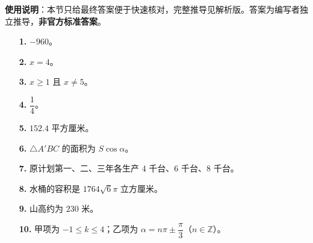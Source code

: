 
\begin{gknotice}
\textbf{使用说明}：本节只给最终答案便于快速核对，完整推导见解析版。答案为编写者独立推导，\textbf{非官方标准答案}。
\end{gknotice}

\begin{itemize}[leftmargin=2.6em]
  \item[\textbf{1.}] $-960$。
  \item[\textbf{2.}] $x=4$。
  \item[\textbf{3.}] $x\ge1$ 且 $x\ne5$。
  \item[\textbf{4.}] $\dfrac14$。
  \item[\textbf{5.}] $152.4$ 平方厘米。
  \item[\textbf{6.}] $\triangle A'BC$ 的面积为 $S\cos\alpha$。
\end{itemize}

\begin{itemize}[leftmargin=2.6em]
  \item[\textbf{7.}] 原计划第一、二、三年各生产 $4$ 千台、$6$ 千台、$8$ 千台。
  \item[\textbf{8.}] 水桶的容积是 $1764\sqrt6\pi$ 立方厘米。
  \item[\textbf{9.}] 山高约为 $230$ 米。
  \item[\textbf{10.}] 甲项为 $-1\le k\le4$；乙项为 $\alpha=n\pi\pm\dfrac\pi3$（$n\in\mathbb Z$）。
\end{itemize}
